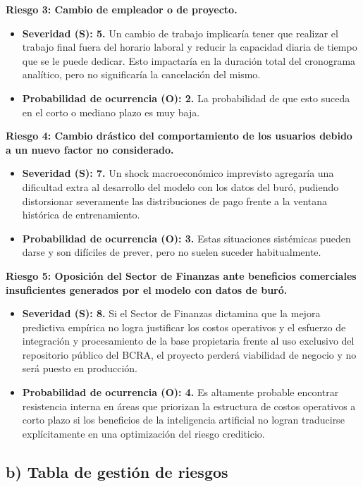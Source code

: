 \documentclass[
11pt, %
]{charter}
\begin{document}
\textbf{Riesgo 3: Cambio de empleador o de proyecto.}
\begin{itemize}
    \item \textbf{Severidad (S): 5.} Un cambio de trabajo implicaría tener que realizar el trabajo final fuera del horario laboral y reducir la capacidad diaria de tiempo que se le puede dedicar. Esto impactaría en la duración total del cronograma analítico, pero no significaría la cancelación del mismo.
    \item \textbf{Probabilidad de ocurrencia (O): 2.} La probabilidad de que esto suceda en el corto o mediano plazo es muy baja.
\end{itemize}

\textbf{Riesgo 4: Cambio drástico del comportamiento de los usuarios debido a un nuevo factor no considerado.}
\begin{itemize}
    \item \textbf{Severidad (S): 7.} Un shock macroeconómico imprevisto agregaría una dificultad extra al desarrollo del modelo con los datos del buró, pudiendo distorsionar severamente las distribuciones de pago frente a la ventana histórica de entrenamiento.
    \item \textbf{Probabilidad de ocurrencia (O): 3.} Estas situaciones sistémicas pueden darse y son difíciles de prever, pero no suelen suceder habitualmente.
\end{itemize}

\textbf{Riesgo 5: Oposición del Sector de Finanzas ante beneficios comerciales insuficientes generados por el modelo con datos de buró.}
\begin{itemize}
    \item \textbf{Severidad (S): 8.} Si el Sector de Finanzas dictamina que la mejora predictiva empírica no logra justificar los costos operativos y el esfuerzo de integración y procesamiento de la base propietaria frente al uso exclusivo del repositorio público del BCRA, el proyecto perderá viabilidad de negocio y no será puesto en producción.
    \item \textbf{Probabilidad de ocurrencia (O): 4.} Es altamente probable encontrar resistencia interna en áreas que priorizan la estructura de costos operativos a corto plazo si los beneficios de la inteligencia artificial no logran traducirse explícitamente en una optimización del riesgo crediticio.
\end{itemize}

\subsection*{b) Tabla de gestión de riesgos}
\end{document}
